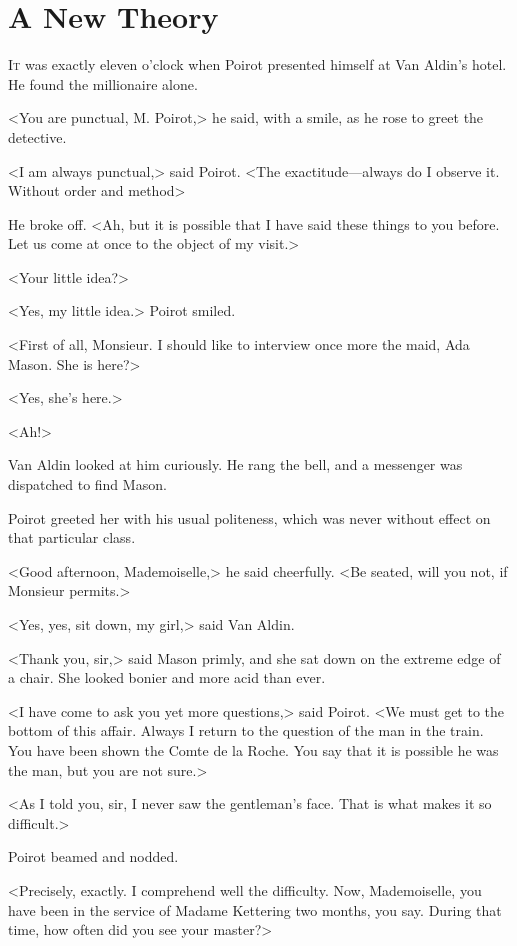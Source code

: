 \chapter{A New Theory}



\lettrine{I}{t} was exactly eleven o'clock when Poirot presented himself at Van Aldin's hotel. He found the millionaire alone.

\zz
<You are punctual, M. Poirot,> he said, with a smile, as he rose to greet the detective.

<I am always punctual,> said Poirot. <The exactitude—always do I observe it. Without order and method\longdash>

He broke off. <Ah, but it is possible that I have said these things to you before. Let us come at once to the object of my visit.>

<Your little idea?>

<Yes, my little idea.> Poirot smiled.

<First of all, Monsieur. I should like to interview once more the maid, Ada Mason. She is here?>

<Yes, she's here.>

<Ah!>

Van Aldin looked at him curiously. He rang the bell, and a messenger was dispatched to find Mason.

Poirot greeted her with his usual politeness, which was never without effect on that particular class.

<Good afternoon, Mademoiselle,> he said cheerfully. <Be seated, will you not, if Monsieur permits.>

<Yes, yes, sit down, my girl,> said Van Aldin.

<Thank you, sir,> said Mason primly, and she sat down on the extreme edge of a chair. She looked bonier and more acid than ever.

<I have come to ask you yet more questions,> said Poirot. <We must get to the bottom of this affair. Always I return to the question of the man in the train. You have been shown the Comte de la Roche. You say that it is possible he was the man, but you are not sure.>

<As I told you, sir, I never saw the gentleman's face. That is what makes it so difficult.>

Poirot beamed and nodded.

<Precisely, exactly. I comprehend well the difficulty. Now, Mademoiselle, you have been in the service of Madame Kettering two months, you say. During that time, how often did you see your master?>

